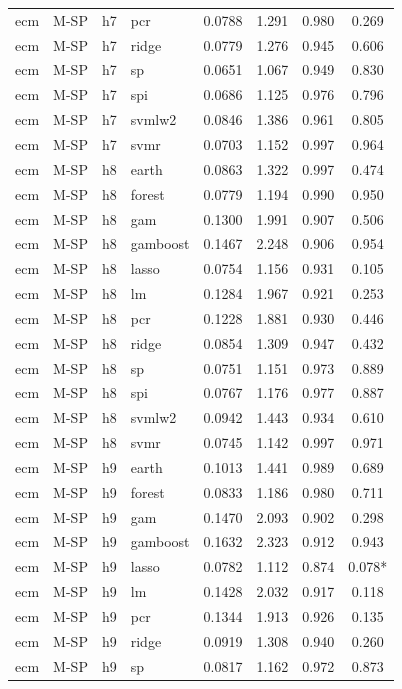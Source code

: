 \begin{ThreePartTable}
\begin{longtable}[t]{llclcccc}
ecm & M-SP & h7 & pcr & 0.0788 & 1.291 & 0.980 & 0.269\\
ecm & M-SP & h7 & ridge & 0.0779 & 1.276 & 0.945 & 0.606\\
ecm & M-SP & h7 & sp & 0.0651 & 1.067 & 0.949 & 0.830\\
ecm & M-SP & h7 & spi & 0.0686 & 1.125 & 0.976 & 0.796\\
ecm & M-SP & h7 & svmlw2 & 0.0846 & 1.386 & 0.961 & 0.805\\
ecm & M-SP & h7 & svmr & 0.0703 & 1.152 & 0.997 & 0.964\\
\addlinespace
ecm & M-SP & h8 & earth & 0.0863 & 1.322 & 0.997 & 0.474\\
ecm & M-SP & h8 & forest & 0.0779 & 1.194 & 0.990 & 0.950\\
ecm & M-SP & h8 & gam & 0.1300 & 1.991 & 0.907 & 0.506\\
ecm & M-SP & h8 & gamboost & 0.1467 & 2.248 & 0.906 & 0.954\\
ecm & M-SP & h8 & lasso & 0.0754 & 1.156 & 0.931 & 0.105\\
ecm & M-SP & h8 & lm & 0.1284 & 1.967 & 0.921 & 0.253\\
ecm & M-SP & h8 & pcr & 0.1228 & 1.881 & 0.930 & 0.446\\
ecm & M-SP & h8 & ridge & 0.0854 & 1.309 & 0.947 & 0.432\\
ecm & M-SP & h8 & sp & 0.0751 & 1.151 & 0.973 & 0.889\\
ecm & M-SP & h8 & spi & 0.0767 & 1.176 & 0.977 & 0.887\\
ecm & M-SP & h8 & svmlw2 & 0.0942 & 1.443 & 0.934 & 0.610\\
ecm & M-SP & h8 & svmr & 0.0745 & 1.142 & 0.997 & 0.971\\
\addlinespace
ecm & M-SP & h9 & earth & 0.1013 & 1.441 & 0.989 & 0.689\\
ecm & M-SP & h9 & forest & 0.0833 & 1.186 & 0.980 & 0.711\\
ecm & M-SP & h9 & gam & 0.1470 & 2.093 & 0.902 & 0.298\\
ecm & M-SP & h9 & gamboost & 0.1632 & 2.323 & 0.912 & 0.943\\
ecm & M-SP & h9 & lasso & 0.0782 & 1.112 & 0.874 & 0.078*\\
ecm & M-SP & h9 & lm & 0.1428 & 2.032 & 0.917 & 0.118\\
ecm & M-SP & h9 & pcr & 0.1344 & 1.913 & 0.926 & 0.135\\
ecm & M-SP & h9 & ridge & 0.0919 & 1.308 & 0.940 & 0.260\\
ecm & M-SP & h9 & sp & 0.0817 & 1.162 & 0.972 & 0.873\\

\end{longtable}
\end{ThreePartTable}
